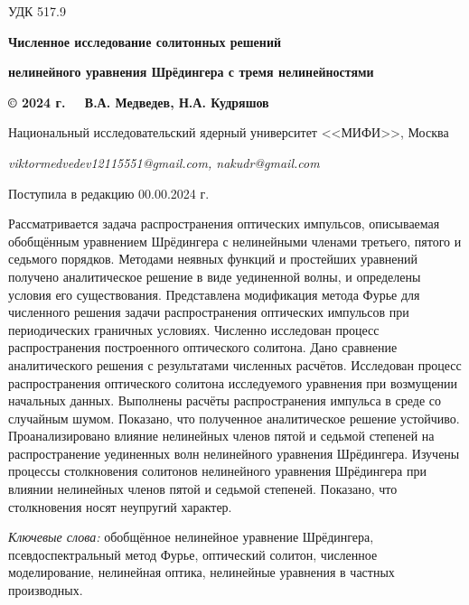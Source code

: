 \documentclass[12pt,a4paper]{article}
\begin{document}
\large %
\noindent
\noindent УДК 517.9
\bigskip

\centerline{\bf Численное исследование солитонных решений}
\centerline{\bf }
\centerline{\bf нелинейного уравнения Шрёдингера с тремя нелинейностями}
\centerline{\bf }
\centerline{\bf  }
\bigskip

\centerline{\bf  © 2024 г. \ \ В.А. Медведев, Н.А. Кудряшов}

\bigskip
\centerline{Национальный исследовательский ядерный университет <<МИФИ>>, Москва}

\centerline{\it viktormedvedev12115551@gmail.com, nakudr@gmail.com}

\centerline{Поступила в редакцию 00.00.2024 г.}
\bigskip

\bigskip
Рассматривается задача распространения оптических импульсов, описываемая обобщённым уравнением Шрёдингера с нелинейными членами третьего, пятого и седьмого порядков. Методами неявных функций и простейших уравнений получено аналитическое решение в виде уединенной волны, и определены условия его существования. Представлена модификация метода Фурье для численного решения задачи распространения оптических импульсов при периодических граничных условиях. Численно исследован процесс распространения построенного оптического солитона. Дано сравнение аналитического решения с результатами численных расчётов. Исследован процесс распространения оптического солитона исследуемого уравнения при возмущении начальных данных. Выполнены расчёты распространения импульса в среде со случайным шумом. Показано, что полученное аналитическое решение устойчиво. Проанализировано влияние нелинейных членов пятой и седьмой степеней на распространение уединенных волн нелинейного уравнения Шрёдингера. Изучены процессы столкновения солитонов нелинейного уравнения Шрёдингера при влиянии нелинейных членов пятой и седьмой степеней. Показано, что столкновения носят неупругий характер.

\textit{Ключевые слова:} обобщённое нелинейное уравнение Шрёдингера, псевдоспектральный метод Фурье, оптический солитон, численное моделирование, нелинейная оптика, нелинейные уравнения в частных производных.
\medskip
\end{document}
